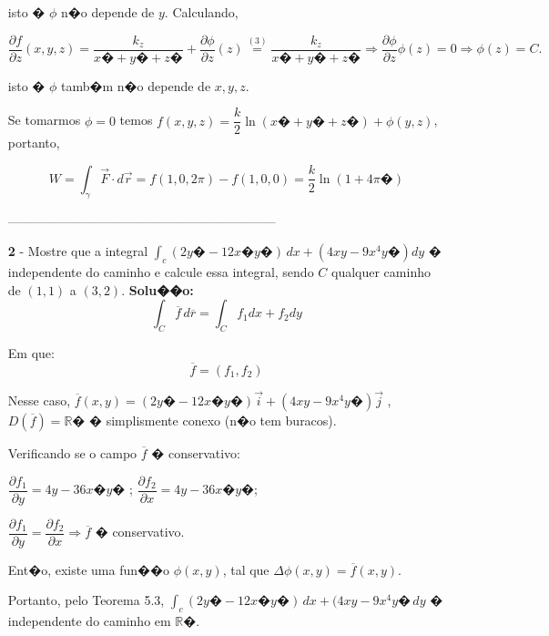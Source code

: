 \documentclass[12pt]{article}
\newcommand{\integral}{\displaystyle\int}
\begin{document}
\begin{enumerate}
          isto � $\phi$ n�o depende de $y$. Calculando,

          \begin{center}

              $\dfrac{\partial f}{\partial z}(x,y,z)=\dfrac{k_z}{x�+y�+z�}+\dfrac{\partial \phi}{\partial z}(z) \stackrel{(3)}{=} \dfrac{k_z}{x�+y�+z�}\Longrightarrow \dfrac{\partial \phi}{\partial z}\phi(z)=0 \Longrightarrow \phi(z)=C.$

          \end{center}

          isto � $\phi$ tamb�m n�o depende de $x,y,z$.

          \begin{center}
              Se tomarmos $\phi = 0$ temos $f(x,y,z)=\dfrac{k}{2} \ln(x�+y�+z�)+ \phi (y,z)$, portanto,
          \end{center}

          $$W=\integral_\gamma \vec{F}\cdot d\vec{r}=f(1,0,2\pi)-f(1,0,0)=\dfrac{k}{2}\ln(1+4\pi�)$$
          \begin{center}
              ---------------------------------------------------------------
          \end{center}
    \item[\textbf{2}]- Mostre que a integral $\int_c (2y�-12x�y�)\,dx +(4xy-9x^4y�)dy$ � independente do caminho e calcule essa integral, sendo $C$ qualquer caminho de $(1,1)$ a $(3,2)$.
          \doublespacing
          \textbf{Solu��o:}
          $$\int_C \overline{f} \,d \overline{r}=\int_C f_1dx + f_2dy$$


          Em que:$$\overline{f}=(f_1,f_2)$$

          Nesse caso, $\overline{f}(x,y)=(2y�-12x�y�)\vec{i}+(4xy-9x^4y�)\vec{j}$ , $D(\overline{f})=\mathbb{R}�$ � simplismente conexo (n�o tem buracos).

          Verificando se o campo $\overline{f}$ � conservativo:
          \begin{center}
              $\dfrac{\partial f_1}{\partial y} = 4y - 36x�y� $ ; $\dfrac{\partial f_2}{\partial x} = 4y - 36x�y� $;

              $\dfrac{\partial f_1}{\partial y} = \dfrac{\partial f_2}{\partial x} \Rightarrow \overline{f} $ � conservativo.
              \singlespacing
          \end{center}
          Ent�o, existe uma fun��o $\phi(x,y)$, tal que $\Delta \phi(x,y) = \overline{f}(x,y)$.

          Portanto, pelo Teorema 5.3, $\int_c (2y�-12x�y�)\,dx + (4xy - 9x^4y� \,dy$ � independente do caminho em $\mathbb{R}�$.


\end{enumerate}
\end{document}
